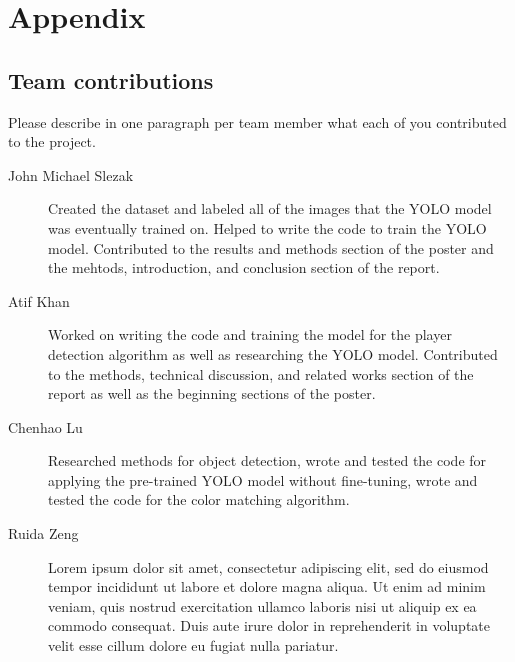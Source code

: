 \section*{Appendix}

\subsection*{Team contributions}

Please describe in one paragraph per team member what each of you contributed to the project.
\begin{description}
\item[John Michael Slezak] Created the dataset and labeled all of the images that the YOLO model was eventually trained on. Helped to write the code to train the YOLO model. Contributed to the results and methods section of the poster and the mehtods, introduction, and conclusion section of the report. 
\item[Atif Khan] Worked on writing the code and training the model for the player detection algorithm as well as researching the YOLO model. Contributed to the methods, technical discussion, and related works section of the report as well as the beginning sections of the poster.
\item [Chenhao Lu] Researched methods for object detection, wrote and tested the code for applying the pre-trained YOLO model without fine-tuning, wrote and tested the code for the color matching algorithm.
\item [Ruida Zeng] Lorem ipsum dolor sit amet, consectetur adipiscing elit, sed do eiusmod tempor incididunt ut labore et dolore magna aliqua. Ut enim ad minim veniam, quis nostrud exercitation ullamco laboris nisi ut aliquip ex ea commodo consequat. Duis aute irure dolor in reprehenderit in voluptate velit esse cillum dolore eu fugiat nulla pariatur.
\end{description}


